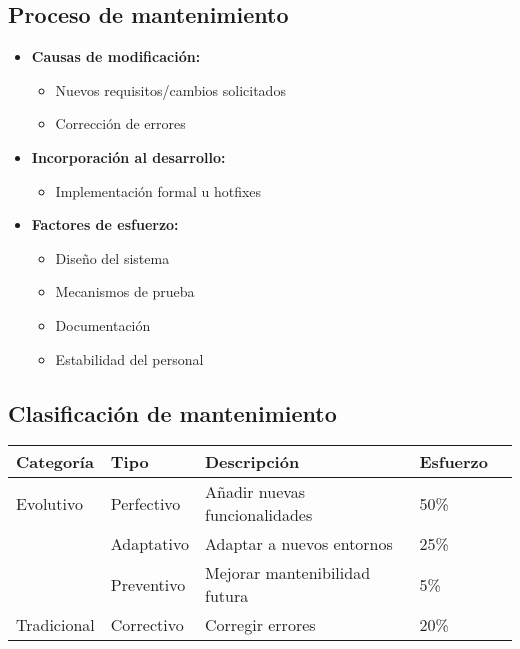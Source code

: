 \subsection{Proceso de mantenimiento}\label{subsec:proceso-de-mantenimiento}
\begin{itemize}
    \item \textbf{Causas de modificación:}
    \begin{itemize}
        \item Nuevos requisitos/cambios solicitados
        \item Corrección de errores
    \end{itemize}

    \item \textbf{Incorporación al desarrollo:}
    \begin{itemize}
        \item Implementación formal u hotfixes
    \end{itemize}

    \item \textbf{Factores de esfuerzo:}
    \begin{itemize}
        \item Diseño del sistema
        \item  Mecanismos de prueba
        \item Documentación
        \item  Estabilidad del personal
    \end{itemize}
\end{itemize}

\subsection{Clasificación de mantenimiento}\label{subsec:clasificacion-de-mantenimiento}
\begin{tabular}{|l|l|l|p{6cm}|c|}
    \hline
    \textbf{Categoría} & \textbf{Tipo} & \textbf{Descripción}          & \textbf{Esfuerzo} \\
    \hline
    Evolutivo          & Perfectivo    & Añadir nuevas funcionalidades & 50\%              \\
    \hline
    & Adaptativo    & Adaptar a nuevos entornos     & 25\%              \\
    \hline
    & Preventivo    & Mejorar mantenibilidad futura & 5\%               \\
    \hline
    Tradicional        & Correctivo    & Corregir errores              & 20\%              \\
    \hline
\end{tabular}

